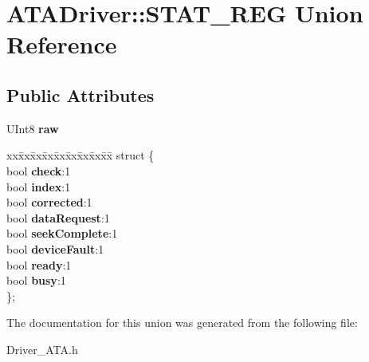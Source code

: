 \hypertarget{union_a_t_a_driver_1_1_s_t_a_t___r_e_g}{}\section{A\+T\+A\+Driver\+:\+:S\+T\+A\+T\+\_\+\+R\+EG Union Reference}
\label{union_a_t_a_driver_1_1_s_t_a_t___r_e_g}
\subsection*{Public Attributes}
\begin{DoxyCompactItemize}
\item 
\mbox{\label{union_a_t_a_driver_1_1_s_t_a_t___r_e_g_acb7a473b68da01bb4eeaf70cf37319af}} 
U\+Int8 {\bfseries raw}
\item 
\mbox{\label{union_a_t_a_driver_1_1_s_t_a_t___r_e_g_a5d80f22061dd7de450901e155729d9ea}} 
\begin{tabbing}
xx\=xx\=xx\=xx\=xx\=xx\=xx\=xx\=xx\=\kill
struct \{\\
\>bool {\bfseries check}:1\\
\>bool {\bfseries index}:1\\
\>bool {\bfseries corrected}:1\\
\>bool {\bfseries dataRequest}:1\\
\>bool {\bfseries seekComplete}:1\\
\>bool {\bfseries deviceFault}:1\\
\>bool {\bfseries ready}:1\\
\>bool {\bfseries busy}:1\\
\}; \\

\end{tabbing}\end{DoxyCompactItemize}


The documentation for this union was generated from the following file\+:\begin{DoxyCompactItemize}
\item 
Driver\+\_\+\+A\+T\+A.\+h\end{DoxyCompactItemize}

